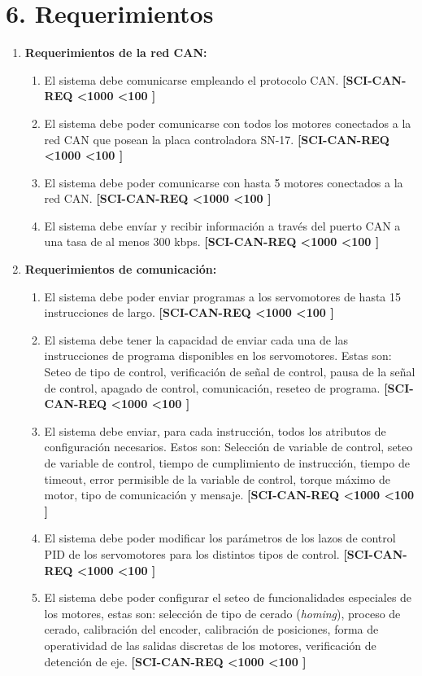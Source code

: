 \documentclass[
11pt, %
]{charter}
\begin{document}
\section{6. Requerimientos}
\label{sec:requerimientos}
\newcommand{\leadingZeroes}[1]{%
\ifnum #1<100{0}\fi%
\ifnum #1<10{0}\fi%
#1}
%
%
\newcommand{\REQ}{%
\stepcounter{REQ}%
\textbf{[SCI-CAN-REQ{\leadingZeroes{\theREQ}]}}}
%

\begin{enumerate}
	\item \textbf{Requerimientos de la red CAN:}
	\begin{enumerate}
			\item El sistema debe comunicarse empleando el protocolo CAN. \REQ
			\item El sistema debe poder comunicarse con todos los motores conectados a la red CAN que posean la placa controladora SN-17. \REQ
			\item El sistema debe poder comunicarse con hasta 5 motores conectados a la red CAN. \REQ
			\item El sistema debe envíar y recibir información a través del puerto CAN a una tasa de al
menos 300 kbps. \REQ
	\end{enumerate}
	\item \textbf{Requerimientos de comunicación:}
	\begin{enumerate}
		\item El sistema debe poder enviar programas a los servomotores de hasta 15 instrucciones
de largo. \REQ
		\item El sistema debe tener la capacidad de enviar cada una de las instrucciones de
programa disponibles en los servomotores. Estas son: Seteo de tipo de control,
verificación de señal de control, pausa de la señal de control, apagado de control,
comunicación, reseteo de programa. \REQ
		\item El sistema debe enviar, para cada instrucción, todos los atributos de configuración
necesarios. Estos son: Selección de variable de control, seteo de variable de control,
tiempo de cumplimiento de instrucción, tiempo de timeout, error permisible de la
variable de control, torque máximo de motor, tipo de comunicación y mensaje. \REQ
		\item El sistema debe poder modificar los parámetros de los lazos de control PID de los
servomotores para los distintos tipos de control. \REQ
		\item El sistema debe poder configurar el seteo de funcionalidades especiales de los
motores, estas son: selección de tipo de cerado (\textit{homing}), proceso de cerado, calibración del encoder, calibración de posiciones, forma de operatividad de las salidas discretas de los motores, verificación de detención de eje. \REQ

\end{enumerate}
\end{enumerate}
\end{document}
